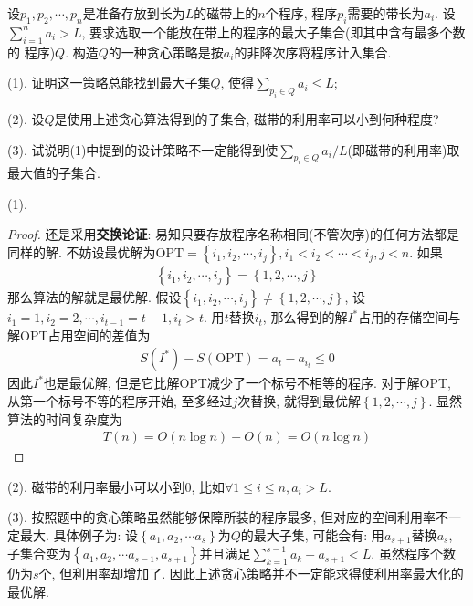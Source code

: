 \documentclass{article}
\begin{document}
\pagebreak

\begin{homeworkProblem}
	设$p_1,p_2,\cdots,p_n$是准备存放到长为$L$的磁带上的$n$个程序, 程序$p_i$需要的带长为$a_i$. 设$\displaystyle \sum_{i=1}^n{a_i}>L$, 要求选取一个能放在带上的程序的最大子集合(即其中含有最多个数的
	程序)$Q$. 构造$Q$的一种贪心策略是按$a_i$的非降次序将程序计入集合.

	(1). 证明这一策略总能找到最大子集$Q$, 使得$\displaystyle \sum_{p_i\in Q}{a_i}\le L$;

	(2). 设$Q$是使用上述贪心算法得到的子集合, 磁带的利用率可以小到何种程度?

	(3). 试说明(1)中提到的设计策略不一定能得到使$\displaystyle \sum_{p_i\in Q}{a_i}/L$(即磁带的利用率)取最大值的子集合.
	\\

	\solution 
	
	(1).
	\begin{proof}
		还是采用\textbf{交换论证}: 易知只要存放程序名称相同(不管次序)的任何方法都是同样的解. 不妨设最优解为$\text{OPT}=\left\{ i_1,i_2,\cdots ,i_j \right\} ,i_1<i_2<\cdots <i_j,j < n	$. 如果
		\begin{align}
			\left\{ i_1,i_2,\cdots ,i_j \right\} =\left\{ 1,2,\cdots ,j \right\}
		\end{align}
		那么算法的解就是最优解. 假设$\left\{ i_1,i_2,\cdots ,i_j \right\} \ne \left\{ 1,2,\cdots ,j \right\}$, 设$i_1=1,i_2=2,\cdots, i_{t-1}=t-1,i_t>t$. 用$t$替换$i_t$, 那么得到的解$I^{\ast}$占用的存储空间与解OPT占用空间的差值为
		\begin{align}
			S\left( I^{\ast} \right) -S\left( \text{OPT} \right) =a_t-a_{i_t}\le 0
		\end{align}
		因此$I^{\ast}$也是最优解, 但是它比解OPT减少了一个标号不相等的程序. 对于解OPT, 从第一个标号不等的程序开始, 至多经过$j$次替换, 就得到最优解$\left\{ 1,2,\cdots ,j \right\}$. 显然算法的时间复杂度为
		\begin{align}
			T\left( n \right) =O\left( n\log n \right) +O\left( n \right) =O\left( n\log n \right) 
		\end{align}
	\end{proof}
	
	(2). 磁带的利用率最小可以小到0, 比如$\forall 1\leq i\leq n,a_i>L$.

	(3). 按照题中的贪心策略虽然能够保障所装的程序最多, 但对应的空间利用率不一定最大. 具体例子为: 设$\left\{ a_1,a_2,\cdots a_s \right\} $为$Q$的最大子集, 可能会有: 用$a_{s+1}$替换$a_s$, 子集合变为$\left\{ a_1,a_2,\cdots a_{s-1},a_{s+1} \right\} $并且满足$\displaystyle \sum_{k=1}^{s-1}{a_k}+a_{s+1}<L$. 虽然程序个数仍为$s$个, 但利用率却增加了. 因此上述贪心策略并不一定能求得使利用率最大化的最优解.


\end{homeworkProblem}
\end{document}
